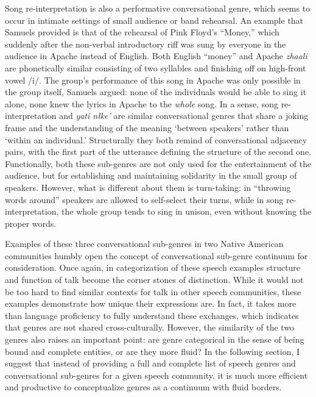 \documentclass[12pt]{article}
\begin{document}
Song re-interpretation is also a performative conversational genre, which seems to occur in intimate settings of small audience or band rehearsal. An example that Samuels provided is that of the rehearsal of Pink Floyd's ``Money,'' which suddenly after the non-verbal introductory riff was sung by everyone in the audience in Apache instead of English. Both English ``money'' and Apache \textit{zhaali} are phonetically similar consisting of two syllables and finishing off on high-front vowel /i/. The group's performance of this song in Apache was only possible in the group itself, Samuels argued: none of the individuals would be able to sing it alone, none knew the lyrics in Apache to the \textit{whole} song. In a sense, song re-interpretation and \textit{yati n\l ke'} are similar conversational genres that share a joking frame and the understanding of the meaning `between speakers' rather than `within an individual.' Structurally they both remind of conversational adjacency pairs, with the first part of the utterance defining the structure of the second one. Functionally, both these sub-genres are not only used for the entertainment of the audience, but for establishing and maintaining solidarity in the small group of speakers. However, what is different about them is turn-taking: in ``throwing words around'' speakers are allowed to self-select their turns, while in song re-interpretation, the whole group tends to sing in unison, even without knowing the proper words. 

Examples of these three conversational sub-genres in two Native American communities humbly open the concept of conversational sub-genre continuum for consideration. Once again, in categorization of these speech examples structure and function of talk become the corner stones of distinction. While it would not be too hard to find similar contexts for talk in other speech communities, these examples demonstrate how unique their expressions are. In fact, it takes more than language proficiency to fully understand these exchanges, which indicates that genres are not shared cross-culturally. However, the similarity of the two genres also raises an important point: are genre categorical in the sense of being bound and complete entities, or are they more fluid? In the following section, I suggest that instead of providing a full and complete list of speech genres and conversational sub-genres for a given speech community, it is much more efficient and productive to conceptualize genres as a continuum with fluid borders.
\end{document}
